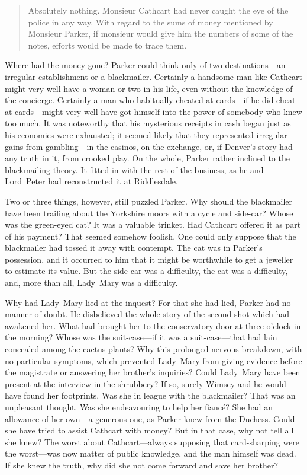 \begin{quote}
Absolutely nothing. Monsieur Cathcart had never caught the eye of the police in any way. With regard to the sums of money mentioned by Monsieur Parker, if monsieur would give him the numbers of some of the notes, efforts would be made to trace them.
\end{quote}

Where had the money gone? Parker could think only of two destinations—an irregular establishment or a blackmailer. Certainly a handsome man like Cathcart might very well have a woman or two in his life, even without the knowledge of the concierge. Certainly a man who habitually cheated at cards—if he did cheat at cards—might very well have got himself into the power of somebody who knew too much.  It was noteworthy that his mysterious receipts in cash began just as his economies were exhausted; it seemed likely that they represented irregular gains from gambling—in the casinos, on the exchange, or, if Denver's story had any truth in it, from crooked play. On the whole, Parker rather inclined to the blackmailing theory. It fitted in with the rest of the business, as he and Lord~Peter had reconstructed it at Riddlesdale.

Two or three things, however, still puzzled Parker. Why should the blackmailer have been trailing about the Yorkshire moors with a cycle and side-car? Whose was the green-eyed cat? It was a valuable trinket.  Had Cathcart offered it as part of his payment? That seemed somehow foolish. One could only suppose that the blackmailer had tossed it away with contempt. The cat was in Parker's possession, and it occurred to him that it might be worthwhile to get a jeweller to estimate its value.  But the side-car was a difficulty, the cat was a difficulty, and, more than all, Lady~Mary was a difficulty.

Why had Lady~Mary lied at the inquest? For that she had lied, Parker had no manner of doubt. He disbelieved the whole story of the second shot which had awakened her. What had brought her to the conservatory door at three o'clock in the morning? Whose was the suit-case—if it was a suit-case—that had lain concealed among the cactus plants? Why this prolonged nervous breakdown, with no particular symptoms, which prevented Lady~Mary from giving evidence before the magistrate or answering her brother's inquiries? Could Lady~Mary have been present at the interview in the shrubbery? If so, surely Wimsey and he would have found her footprints. Was she in league with the blackmailer? That was an unpleasant thought. Was she endeavouring to help her fiancé? She had an allowance of her own—a generous one, as Parker knew from the Duchess. Could she have tried to assist Cathcart with money? But in that case, why not tell all she knew? The worst about Cathcart—always supposing that card-sharping were the worst—was now matter of public knowledge, and the man himself was dead. If she knew the truth, why did she not come forward and save her brother?

